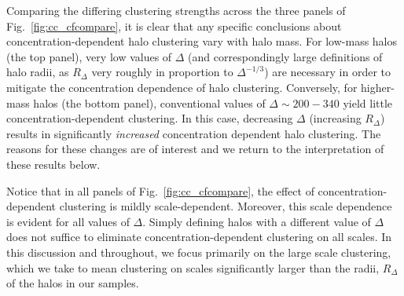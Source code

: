 \documentclass[usenatbib]{mnras}
\begin{document}
Comparing the differing clustering strengths across the three panels of Fig.~\ref{fig:cc_cfcompare}, 
it is clear that any specific conclusions about concentration-dependent halo clustering 
vary with halo mass. For low-mass halos (the top panel), 
very low values of $\Delta$ (and correspondingly large definitions of halo radii, 
as $R_{\Delta}$ very roughly in proportion to $\Delta^{-1/3}$) are necessary in order 
to mitigate the concentration dependence of halo clustering. Conversely, for higher-mass 
halos (the bottom panel), conventional values of $\Delta \sim 200-340$ yield little 
concentration-dependent clustering. In this case, decreasing $\Delta$ (increasing $R_{\Delta}$) 
results in significantly {\em increased} concentration dependent halo clustering. The reasons for 
these changes are of interest and we return to the interpretation of these results below.


Notice that in all panels of Fig.~\ref{fig:cc_cfcompare}, the effect of concentration-dependent clustering is
mildly scale-dependent. Moreover, this scale dependence is evident for all values of $\Delta$. Simply
defining halos with a different value of $\Delta$ does not suffice to eliminate concentration-dependent
clustering on all scales. In this discussion and throughout, we focus primarily on the large scale clustering,
which we take to mean clustering on scales significantly larger than the radii, $R_{\Delta}$ of the halos in our
samples.
\end{document}
